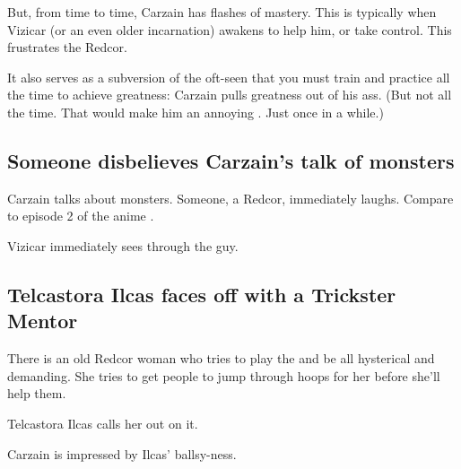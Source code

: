 But, from time to time, Carzain has flashes of mastery. This is typically when Vizicar (or an even older incarnation) awakens to help him, or take control. This frustrates the Redcor. 

It also serves as a subversion of the oft-seen  that you must train and practice all the time to achieve greatness: Carzain pulls greatness out of his ass. (But not all the time. That would make him an annoying . Just once in a while.)









\subsection{Someone disbelieves Carzain's talk of monsters}
Carzain talks about monsters. Someone, a Redcor, immediately laughs.  Compare to episode 2 of the anime \cite{Anime:Gilgamesh}.

Vizicar immediately sees through the guy. 









\subsection{Telcastora Ilcas faces off with a Trickster Mentor}
There is an old Redcor woman who tries to play the  and be all hysterical and demanding. She tries to get people to jump through hoops for her before she'll help them. 

Telcastora Ilcas calls her out on it. 

Carzain is impressed by Ilcas' ballsy-ness. 









